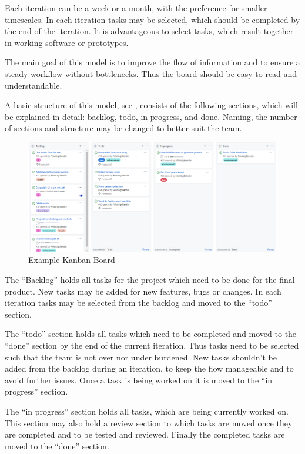 \documentclass[runningheads]{llncs}
\begin{document}
Each iteration can be a week or a month, with the preference for smaller timescales. In each iteration tasks may be selected, 
which should be completed by the end of the iteration. It is advantageous to select tasks, which result together in working software or prototypes.

The main goal of this model is to improve the flow of information and to ensure a steady workflow without bottlenecks. Thus the board should 
be easy to read and understandable. 

A basic structure of this model, see , consists of the following sections, which will be explained in detail: 
backlog, todo, in progress, and done. Naming, the number of sections and structure may be changed to better suit the team.

\begin{figure}[!htb]
  \centering
  \begin{minipage}{1\textwidth}
      \centering
      \includegraphics[width=1\textwidth]{Kanban.PNG}
      \caption{Example Kanban Board}
      \label{fig:kanban}
  \end{minipage}%
\end{figure}

The “Backlog” holds all tasks for the project which need to be done for the final product. New tasks may be added for new features, 
bugs or changes. In each iteration tasks may be selected from the backlog and moved to the “todo” section.

The “todo” section holds all tasks which need to be completed and moved to the “done” section by the end of the current iteration. 
Thus tasks need to be selected such that the team is not over nor under burdened. New tasks shouldn’t be added from the backlog during 
an iteration, to keep the flow manageable and to avoid further issues. Once a task is being worked on it is moved to the “in progress” section.

The “in progress” section holds all tasks, which are being currently worked on. This section may also hold a review section to which 
tasks are moved once they are completed and to be tested and reviewed. Finally the completed tasks are moved to the “done” section.
\end{document}
